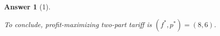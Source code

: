 \documentclass{article}
\newtheorem*{ans}{Answer}
\newcommand{\1}{{\bf 1}}
\newcommand{\0}{{\mathbf{0}}}
\newcommand{\<}{\langle}
\renewcommand{\>}{\rangle}
\newcommand{\dps}{\displaystyle}
\begin{document}
\begin{ans}[1]
\begin{enumerate}[(a)]
\begin{enumerate}[i]
					\end{enumerate}
				
				To conclude, profit-maximizing two-part tariff is $(f^*,p^*) = (8,6)$.
	\end{enumerate}
\end{ans}
\end{document}
